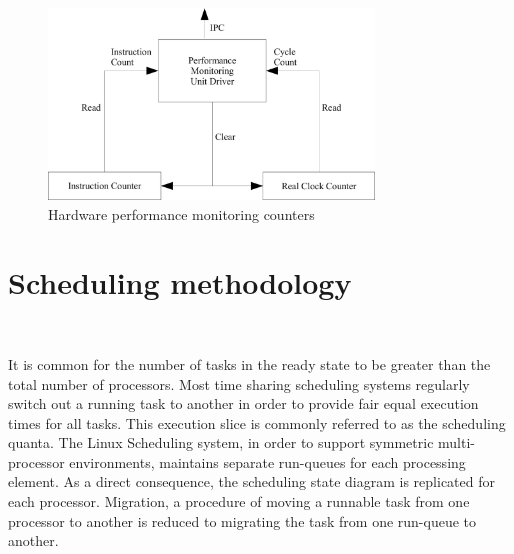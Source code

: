 \begin{figure}[h!]
  \begin{center}
    \includegraphics[height=2in]{figures/HW_Counter.jpg}%
    \caption{Hardware performance monitoring counters}
    \label{fig:hw_counters}
  \end{center}
\end{figure}

\section{Scheduling methodology}~\label{sec:pds}

It is common for the number of tasks in the ready state to be greater than the total number
of processors. Most time sharing scheduling systems regularly switch out a running task
to another in order to provide fair equal execution times for all tasks. This execution slice is commonly 
referred to as the scheduling quanta. The Linux Scheduling system, in order to support symmetric 
multi-processor environments, maintains separate run-queues
for each processing element. As a direct consequence, the scheduling state diagram is replicated for each processor. 
Migration, a procedure of moving a runnable task from one processor to another is reduced to migrating the task from
one run-queue to another. 

